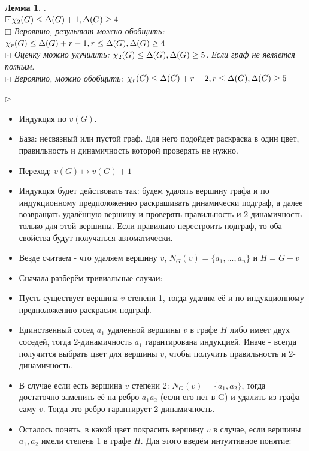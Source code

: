 \documentclass[12pt,a4paper]{article}
\theoremstyle{plain} %
\newtheorem{lemma}[theorem]{Лемма}
\theoremstyle{definition} %
\theoremstyle{remark} %
\begin{document}
	\begin{lemma}.
		\\$\boxdot \chi_2(G) \leq \Delta(G) + 1, \space \Delta(G) \geq 4$\\
		$\boxdot$ Вероятно, результат можно обобщить: $\chi_r(G) \leq \Delta(G) + r - 1, \space r \leq \Delta(G), \space \Delta(G) \geq 4$\\
		$\boxdot$ Оценку можно улучшить: $ \chi_2(G) \leq \Delta(G), \space \Delta(G) \geq 5$. Если граф не является полным.\\
		$\boxdot$ Вероятно, можно обобщить: $\chi_r(G) \leq \Delta(G) + r - 2, \space r \leq \Delta(G), \space \Delta(G) \geq 5$\\
	\end{lemma}
	$\triangleright$
	\begin{itemize}
	\item Индукция по $v(G)$.
	\item База: несвязный или пустой граф. Для него подойдет раскраска в один цвет, правильность и динамичность которой проверять не нужно.
	\item Переход: $v(G)\mapsto v(G)+1$
	\item Индукция будет действовать так: будем удалять вершину графа и по индукционному предположению раскрашивать динамически подграф, а далее возвращать удалённую вершину и проверять правильность и 2-динамичность только для этой вершины. Если правильно перестроить подграф, то оба свойства будут получаться автоматически.
	\item Везде считаем - что удаляем вершину $v$, $N_G(v) = \{a_1, ..., a_n\}$ и $H = G-v$
	\item Сначала разберём тривиальные случаи:
	\item Пусть существует вершина $v$ степени 1, тогда удалим её и по индукционному предположению раскрасим подграф. 
	\item Единственный сосед $a_1$ удаленной вершины $v$ в графе $H$ либо имеет двух соседей, тогда 2-динамичность $a_1$ гарантирована индукцией. Иначе - всегда получится выбрать цвет для вершины $v$, чтобы получить правильность и 2-динамичность.
	\item В случае если есть вершина $v$ степени 2: $N_G(v) = \{a_1, a_2\}$, тогда достаточно заменить её на ребро $a_1a_2$ (если его нет в G) и удалить из графа саму $v$. Тогда это ребро гарантирует 2-динамичность.
	\item Осталось понять, в какой цвет покрасить вершину $v$ в случае, если вершины $a_1, a_2$ имели степень 1 в графе $H$. Для этого введём интуитивное понятие:\\

\end{itemize}
\end{document}
